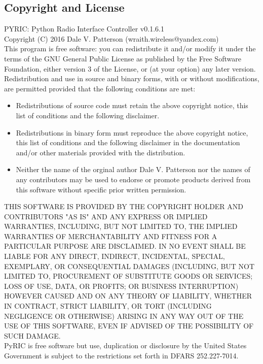 \documentclass[11pt]{article}
\begin{document}
\begin{appendices}
\section{Copyright and License}\label{sec:copy}
PYRIC: Python Radio Interface Controller v0.1.6.1\\

Copyright (C) 2016  Dale V. Patterson (wraith.wireless@yandex.com)\\

This program is free software: you can redistribute it and/or modify it under
the terms of the GNU General Public License\cite{gplv3} as published by the Free
Software Foundation, either version 3 of the License, or (at your option) any 
later version.\\

Redistribution and use in source and binary forms, with or without modifications,
are permitted provided that the following conditions are met:
\begin{itemize}
\item Redistributions of source code must retain the above copyright notice, this
list of conditions and the following disclaimer.
\item Redistributions in binary form must reproduce the above copyright notice,
this list of conditions and the following disclaimer in the documentation and/or 
other materials provided with the distribution.
\item Neither the name of the orginal author Dale V. Patterson nor the names of 
any contributors may be used to endorse or promote products derived from this 
software without specific prior written permission.
\end{itemize}

THIS SOFTWARE IS PROVIDED BY THE COPYRIGHT HOLDER AND CONTRIBUTORS "AS IS" AND
ANY EXPRESS OR IMPLIED WARRANTIES, INCLUDING, BUT NOT LIMITED TO, THE IMPLIED
WARRANTIES OF MERCHANTABILITY AND FITNESS FOR A PARTICULAR PURPOSE ARE DISCLAIMED.
IN NO EVENT SHALL BE LIABLE FOR ANY DIRECT, INDIRECT, INCIDENTAL, SPECIAL,
EXEMPLARY, OR CONSEQUENTIAL DAMAGES (INCLUDING, BUT NOT LIMITED TO, PROCUREMENT
OF SUBSTITUTE GOODS OR SERVICES; LOSS OF USE, DATA, OR PROFITS; OR BUSINESS
INTERRUPTION) HOWEVER CAUSED AND ON ANY THEORY OF LIABILITY, WHETHER IN CONTRACT,
STRICT LIABILITY, OR TORT (INCLUDING NEGLIGENCE OR OTHERWISE) ARISING IN ANY WAY
OUT OF THE USE OF THIS SOFTWARE, EVEN IF ADVISED OF THE POSSIBILITY OF SUCH DAMAGE.\\

PyRIC is free software but use, duplication or disclosure by the United States
Government is subject to the restrictions set forth in DFARS 252.227-7014.\\


\end{appendices}
\end{document}
